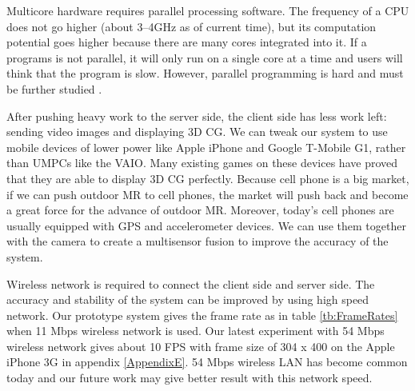 Multicore hardware requires parallel processing software. The frequency of a CPU does not go higher (about 3--4GHz as of current time), but its computation potential goes higher because there are many cores integrated into it. If a programs is not parallel, it will only run on a single core at a time and users will think that the program is slow. However, parallel programming is hard and must be further studied \cite{Reference17}.

After pushing heavy work to the server side, the client side has less work left: sending video images and displaying 3D CG. We can tweak our system to use mobile devices of lower power like Apple iPhone and Google T-Mobile G1, rather than UMPCs like the VAIO. Many existing games on these devices have proved that they are able to display 3D CG perfectly. Because cell phone is a big market, if we can push outdoor MR to cell phones, the market will push back and become a great force for the advance of outdoor MR. Moreover, today's cell phones are usually equipped with GPS and accelerometer devices. We can use them together with the camera to create a multisensor fusion \cite{Reference14} to improve the accuracy of the system.

Wireless network is required to connect the client side and server side. The accuracy and stability of the system can be improved by using high speed network. Our prototype system gives the frame rate as in table \ref{tb:FrameRates} when 11 Mbps wireless network is used. Our latest experiment with 54 Mbps wireless network gives about 10 FPS with frame size of 304 x 400 on the Apple iPhone 3G in appendix \ref{AppendixE}. 54 Mbps wireless LAN has become common today and our future work may give better result with this network speed.
